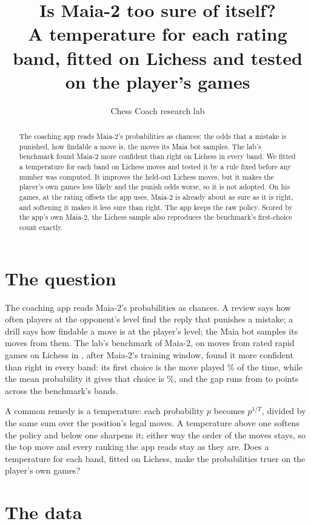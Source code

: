\documentclass[11pt]{article}
\title{Is Maia-2 too sure of itself?\\[0.3em]
\large A temperature for each rating band, fitted on Lichess and tested on the player's games}
\author{Chess Coach research lab}
\date{}
\begin{document}
\maketitle

\begin{abstract}
The coaching app reads Maia-2's probabilities as chances: the odds that a mistake is punished,
how findable a move is, the moves its Maia bot samples. The lab's benchmark found Maia-2 more
confident than right on Lichess in every band. We fitted a temperature for each band on
\FitMoves{} Lichess moves and tested it by a rule fixed before any number was computed. It
improves the held-out Lichess moves, but it makes the player's own games less likely and the
punish odds worse, so it is not adopted. On his games, at the rating offsets the app uses,
Maia-2 is already about as sure as it is right, and softening it makes it less sure than right.
The app keeps the raw policy. Scored by the app's own Maia-2, the Lichess sample also reproduces
the benchmark's first-choice count exactly.
\end{abstract}

\section{The question}

The coaching app reads Maia-2's probabilities as chances. A review says how often players at the
opponent's level find the reply that punishes a mistake; a drill says how findable a move is at
the player's level; the Maia bot samples its moves from them. The lab's benchmark of Maia-2, on
\LichessMoves{} moves from rated rapid games on Lichess in \BenchMonth, after Maia-2's training
window, found it more confident than right in every band: its first choice is the move played
\BenchTop\% of the time, while the mean probability it gives that choice is \BenchConf\%, and
the gap runs from \BenchGapMin{} to \BenchGapMax{} points across the benchmark's bands.

A common remedy is a temperature: each probability $p$ becomes $p^{1/T}$, divided by the same
sum over the position's legal moves. A temperature above one softens the policy and below one
sharpens it; either way the order of the moves stays, so the top move and every ranking the app
reads stay as they are. Does a temperature for each band, fitted on Lichess, make the
probabilities truer on the player's own games?

\section{The data}
\end{document}

